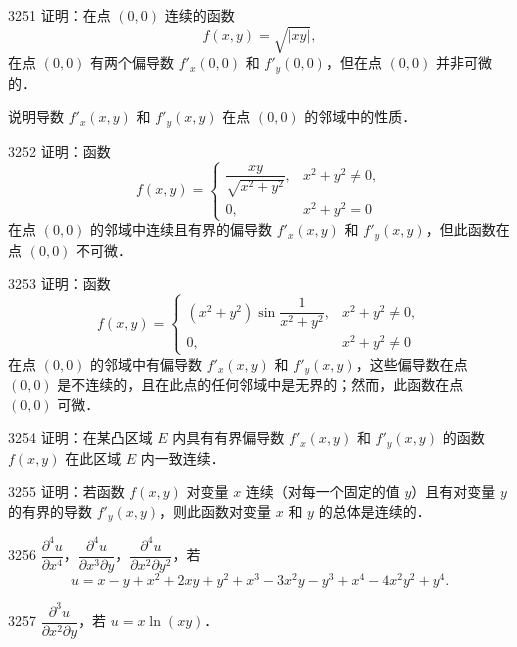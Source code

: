 \begin{prob}[M]{3251}
证明：在点 $(0,0)$ 连续的函数
\[
f(x,y) = \sqrt{|xy|},
\]
在点 $(0,0)$ 有两个偏导数 $f'_x(0,0)$ 和 $f'_y(0,0)$，但在点 $(0,0)$ 并非可微的．

说明导数 $f'_x(x,y)$ 和 $f'_y(x,y)$ 在点 $(0,0)$ 的邻域中的性质．
\end{prob}

\begin{prob}[M]{3252}
证明：函数
\[
f(x,y) = \begin{cases} \dfrac{xy}{\sqrt{x^2+y^2}}, & x^2+y^2 \neq 0, \\ 0, & x^2+y^2 = 0 \end{cases}
\]
在点 $(0,0)$ 的邻域中连续且有界的偏导数 $f'_x(x,y)$ 和 $f'_y(x,y)$，但此函数在点 $(0,0)$ 不可微．
\end{prob}

\begin{prob}[M]{3253}
证明：函数
\[
f(x,y) = \begin{cases} (x^2+y^2)\sin\dfrac{1}{x^2+y^2}, & x^2+y^2 \neq 0, \\ 0, & x^2+y^2 \neq 0 \end{cases}
\]
在点 $(0,0)$ 的邻域中有偏导数 $f'_x(x,y)$ 和 $f'_y(x,y)$，这些偏导数在点 $(0,0)$ 是不连续的，且在此点的任何邻域中是无界的；然而，此函数在点 $(0,0)$ 可微．
\end{prob}

\begin{prob}[M]{3254}
证明：在某凸区域 $E$ 内具有有界偏导数 $f'_x(x,y)$ 和 $f'_y(x,y)$ 的函数 $f(x,y)$ 在此区域 $E$ 内一致连续．
\end{prob}

\begin{prob}[M]{3255}
证明：若函数 $f(x,y)$ 对变量 $x$ 连续（对每一个固定的值 $y$）且有对变量 $y$ 的有界的导数 $f'_y(x,y)$，则此函数对变量 $x$ 和 $y$ 的总体是连续的．
\end{prob}


\begin{prob}[M]{3256}
$\dfrac{\partial^4 u}{\partial x^4}$，$\dfrac{\partial^4 u}{\partial x^3 \partial y}$，$\dfrac{\partial^4 u}{\partial x^2 \partial y^2}$，若
\[
u = x - y + x^2 + 2xy + y^2 + x^3 - 3x^2 y - y^3 + x^4 - 4x^2 y^2 + y^4.
\]
\end{prob}

\begin{prob}[S]{3257}
$\dfrac{\partial^3 u}{\partial x^2 \partial y}$，若 $u = x\ln(xy)$．
\end{prob}

